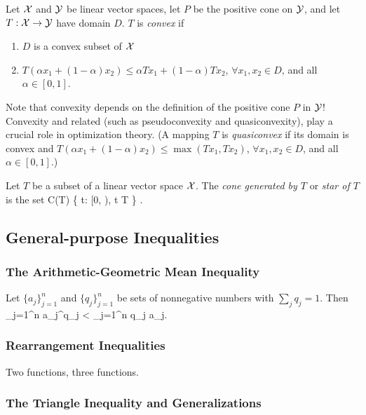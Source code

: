 \begin{Definition}
        Let ${\cal X}$ and ${\cal Y}$ be linear vector spaces, let $P$ be the positive
        cone on ${\cal Y}$, and let $T: {\cal X} \rightarrow {\cal Y}$ have domain $D$.
        $T$ is {\em convex} if
        \begin{enumerate}
                \item $D$ is a convex subset of ${\cal X}$
                \item $T(\alpha x_1 + (1-\alpha) x_2) \le \alpha T x_1 + (1-\alpha)Tx_2$,
                        $\forall x_1, x_2 \in D$, and all $\alpha \in [0, 1]$.
        \end{enumerate}
\end{Definition}

Note that convexity depends on the definition of the positive cone $P$ in ${\cal Y}$!
Convexity and related (such as pseudoconvexity
and quasiconvexity), play a crucial role in optimization theory.
(A mapping $T$ is {\em quasiconvex\/} if its domain is convex and
$T(\alpha x_1 + (1-\alpha) x_2) \le \max(T x_1, Tx_2)$,
                        $\forall x_1, x_2 \in D$, and all $\alpha \in [0, 1]$.)


\begin{Definition}
        Let $T$ be a subset of a linear vector space ${\cal X}$.
        The {\em cone generated by $T$\/} or {\em star of $T$\/}
        is the set
        \beq 
             C(T) \equiv \{ \alpha t: \alpha \in [0, \infty), t \in T \} \subset \calX.
        \eeq 
\end{Definition}

\subsection{General-purpose Inequalities}
\subsubsection{The Arithmetic-Geometric Mean Inequality}
Let $\{ a_j \}_{j=1}^n$ and $\{q_j\}_{j=1}^n$ be sets of nonnegative numbers with
$\sum_j q_j = 1$.
Then
\beq
     \prod_{j=1}^n a_j^{q_j} < \sum_{j=1}^n q_j a_j.
\eeq

\subsubsection{Rearrangement Inequalities}
Two functions, three functions.

\subsubsection{The Triangle Inequality and Generalizations}

